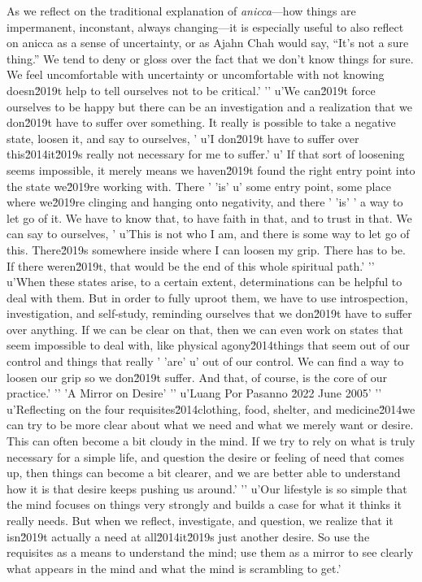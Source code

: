 As we reflect on the traditional explanation of \emph{anicca}---how 
things are impermanent, inconstant, always changing---it is especially 
useful to also reflect on anicca as a sense of uncertainty, or as Ajahn 
Chah would say, ``It's not a sure thing.'' We tend to deny or gloss 
over the fact that we don't know things for sure. We feel uncomfortable 
with uncertainty or uncomfortable with not knowing doesn\u2019t help to tell ourselves not to be critical.'
'\n'
u'We can\u2019t force ourselves to be happy but there can be an investigation and a realization that we don\u2019t have to suffer over something. It really is possible to take a negative state, loosen it, and say to ourselves, '
u'I don\u2019t have to suffer over this\u2014it\u2019s really not necessary for me to suffer.'
u' If that sort of loosening seems impossible, it merely means we haven\u2019t found the right entry point into the state we\u2019re working with. There '
'is'
u' some entry point, some place where we\u2019re clinging and hanging onto negativity, and there '
'is'
' a way to let go of it. We have to know that, to have faith in that, and to trust in that. We can say to ourselves, '
u'This is not who I am, and there is some way to let go of this. There\u2019s somewhere inside where I can loosen my grip. There has to be. If there weren\u2019t, that would be the end of this whole spiritual path.'
'\n'
u'When these states arise, to a certain extent, determinations can be helpful to deal with them. But in order to fully uproot them, we have to use introspection, investigation, and self-study, reminding ourselves that we don\u2019t have to suffer over anything. If we can be clear on that, then we can even work on states that seem impossible to deal with, like physical agony\u2014things that seem out of our control and things that really '
'are'
u' out of our control. We can find a way to loosen our grip so we don\u2019t suffer. And that, of course, is the core of our practice.'
'\n'
'A Mirror on Desire'
'\n'
u'Luang Por Pasanno \u2022 June 2005'
'\n'
u'Reflecting on the four requisites\u2014clothing, food, shelter, and medicine\u2014we can try to be more clear about what we need and what we merely want or desire. This can often become a bit cloudy in the mind. If we try to rely on what is truly necessary for a simple life, and question the desire or feeling of need that comes up, then things can become a bit clearer, and we are better able to understand how it is that desire keeps pushing us around.'
'\n'
u'Our lifestyle is so simple that the mind focuses on things very strongly and builds a case for what it thinks it really needs. But when we reflect, investigate, and question, we realize that it isn\u2019t actually a need at all\u2014it\u2019s just another desire. So use the requisites as a means to understand the mind; use them as a mirror to see clearly what appears in the mind and what the mind is scrambling to get.'

